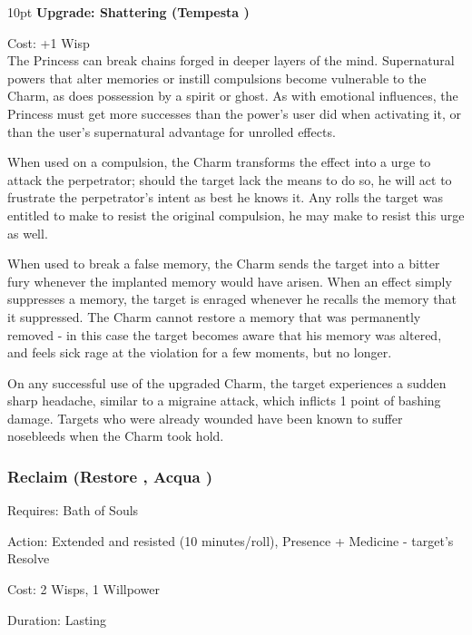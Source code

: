 \begin{myindentpar}{10pt} \textbf{Upgrade: Shattering (Tempesta \textbullet\textbullet\textbullet\textbullet)}

\noindent Cost: +1 Wisp \\

\noindent The Princess can break chains forged in deeper layers of the mind. Supernatural powers that alter memories or instill compulsions become vulnerable to the Charm, as does possession by a spirit or ghost. As with emotional influences, the Princess must get more successes than the power's user did when activating it, or than the user's supernatural advantage for unrolled effects.

When used on a compulsion, the Charm transforms the effect into a urge to attack the perpetrator; should the target lack the means to do so, he will act to frustrate the perpetrator's intent as best he knows it. Any rolls the target was entitled to make to resist the original compulsion, he may make to resist this urge as well. 

When used to break a false memory, the Charm sends the target into a bitter fury whenever the implanted memory would have arisen. When an effect simply suppresses a memory, the target is enraged whenever he recalls the memory that it suppressed. The Charm cannot restore a memory that was permanently removed - in this case the target becomes aware that his memory was altered, and feels sick rage at the violation for a few moments, but no longer.

On any successful use of the upgraded Charm, the target experiences a sudden sharp headache, similar to a migraine attack, which inflicts 1 point of bashing damage. Targets who were already wounded have been known to suffer nosebleeds when the Charm took hold.\end{myindentpar}

\subsubsection*{Reclaim (Restore \textbullet\textbullet\textbullet\textbullet, Acqua \textbullet\textbullet\textbullet)}

\noindent Requires: Bath of Souls

\noindent Action: Extended and resisted (10 minutes/roll), Presence + Medicine - target's Resolve

\noindent Cost: 2 Wisps, 1 Willpower

\noindent Duration: Lasting \\

